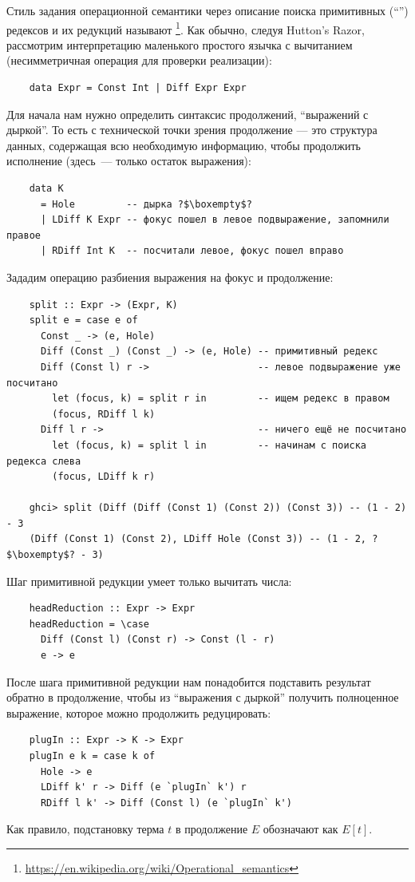 Стиль задания операционной семантики через описание поиска примитивных (``'') редексов и их редукций называют \footnote{\url{https://en.wikipedia.org/wiki/Operational_semantics}}.
Как обычно, следуя Hutton's Razor, рассмотрим интерпретацию маленького простого язычка с вычитанием (несимметричная операция для проверки реализации):
\begin{verbatim}
    data Expr = Const Int | Diff Expr Expr
\end{verbatim}

Для начала нам нужно определить синтаксис продолжений, ``выражений с дыркой''.
То есть с технической точки зрения продолжение --- это структура данных, содержащая всю необходимую информацию, чтобы продолжить исполнение (здесь~--- только остаток выражения):
\begin{verbatim}
    data K
      = Hole         -- дырка ?$\boxempty$?
      | LDiff K Expr -- фокус пошел в левое подвыражение, запомнили правое
      | RDiff Int K  -- посчитали левое, фокус пошел вправо
\end{verbatim}

Зададим операцию разбиения выражения на фокус и продолжение:
\begin{verbatim}
    split :: Expr -> (Expr, K)
    split e = case e of
      Const _ -> (e, Hole)
      Diff (Const _) (Const _) -> (e, Hole) -- примитивный редекс
      Diff (Const l) r ->                   -- левое подвыражение уже посчитано
        let (focus, k) = split r in         -- ищем редекс в правом
        (focus, RDiff l k)
      Diff l r ->                           -- ничего ещё не посчитано
        let (focus, k) = split l in         -- начинам с поиска редекса слева
        (focus, LDiff k r)

    ghci> split (Diff (Diff (Const 1) (Const 2)) (Const 3)) -- (1 - 2) - 3
    (Diff (Const 1) (Const 2), LDiff Hole (Const 3)) -- (1 - 2, ?$\boxempty$? - 3)
\end{verbatim}

Шаг примитивной редукции умеет только вычитать числа:
\begin{verbatim}
    headReduction :: Expr -> Expr
    headReduction = \case
      Diff (Const l) (Const r) -> Const (l - r)
      e -> e
\end{verbatim}

После шага примитивной редукции нам понадобится подставить результат обратно в продолжение, чтобы из ``выражения с дыркой'' получить полноценное выражение, которое можно продолжить редуцировать:
\begin{verbatim}
    plugIn :: Expr -> K -> Expr
    plugIn e k = case k of
      Hole -> e
      LDiff k' r -> Diff (e `plugIn` k') r
      RDiff l k' -> Diff (Const l) (e `plugIn` k')
\end{verbatim}
Как правило, подстановку терма $t$ в продолжение $E$ обозначают как $E[t]$.

